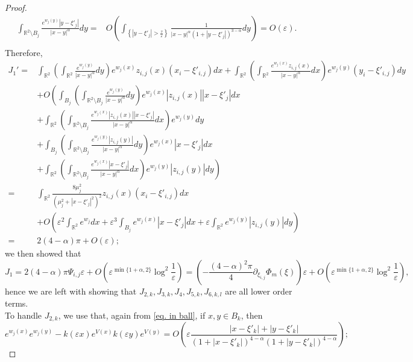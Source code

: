 \documentclass[11pt]{article}
\begin{document}
\begin{proof}
\begin{align*}
\int_{\mathbb R^2\setminus B_j}\frac{e^{w_j(y)}\left|y-\xi'_j\right|}{|x-y|^\alpha}dy=&O\left(\int_{\left\{\left|y-\xi'_j\right|>\frac\tau\varepsilon\right\}}\frac1{|x-y|^\alpha\left(1+\left|y-\xi'_j\right|\right)^{3-\alpha}}dy\right)=O(\varepsilon).\\
\end{align*}
Therefore,
\begin{align*}
J_1'=&\int_{\mathbb R^2}\left(\int_{\mathbb R^2}\frac{e^{w_j(y)}}{|x-y|^\alpha}dy\right)e^{w_j(x)}z_{i,j}(x)\left(x_i-\xi'_{i,j}\right)dx+\int_{\mathbb R^2}\left(\int_{\mathbb R^2}\frac{e^{w_j(x)}z_{i,j}(x)}{|x-y|^\alpha}dx\right)e^{w_j(y)}\left(y_i-\xi'_{i,j}\right)dy\\
&+O\left(\int_{B_j}\left(\int_{\mathbb R^2\setminus B_j}\frac{e^{w_j(y)}}{|x-y|^\alpha}dy\right)e^{w_j(x)}|z_{i,j}(x)|\left|x-\xi'_j\right|dx\right.\\
&\left.+\int_{\mathbb R^2}\left(\int_{\mathbb R^2\setminus B_j}\frac{e^{w_j(x)}|z_{i,j}(x)|\left|x-\xi'_j\right|}{|x-y|^\alpha}dx\right)e^{w_j(y)}dy\right.\\
&\left.+\int_{B_j}\left(\int_{\mathbb R^2\setminus B_j}\frac{e^{w_j(y)}|z_{i,j}(y)|}{|x-y|^\alpha}dy\right)e^{w_j(x)}\left|x-\xi'_j\right|dx\right.\\
&\left.+\int_{\mathbb R^2}\left(\int_{\mathbb R^2\setminus B_j}\frac{e^{w_j(x)}\left|x-\xi'_j\right|}{|x-y|^\alpha}dx\right)e^{w_j(y)}|z_{i,j}(y)|dy\right)\\
=&\int_{\mathbb R^2}\frac{8\mu_j^2}{\left(\mu_j^2+\left|x-\xi'_j\right|^2\right)^2}z_{i,j}(x)\left(x_i-\xi'_{i,j}\right)dx\\
&+O\left(\varepsilon^2\int_{\mathbb R^2}e^{w_j}dx+\varepsilon^3\int_{B_j}e^{w_j(x)}\left|x-\xi'_j\right|dx+\varepsilon\int_{\mathbb R^2}e^{w_j(y)}|z_{i,j}(y)|dy\right)\\
=&2(4-\alpha)\pi+O(\varepsilon);
\end{align*}
we then showed that
$$J_1=2(4-\alpha)\pi\Psi_{i,j}\varepsilon+O\left(\varepsilon^{\min\{1+\alpha,2\}}\log^2\frac1\varepsilon\right)=\left(-\frac{(4-\alpha)^2\pi}4\partial_{\xi_{i,j}}\Phi_m(\xi)\right)\varepsilon+O\left(\varepsilon^{\min\{1+\alpha,2\}}\log^2\frac1\varepsilon\right),$$
hence we are left with showing that $J_{2,k},J_{3,k},J_4,J_{5,k},J_{6,k,l}$ are all lower order terms.\\
To handle $J_{2,k}$, we use that, again from \eqref{eq. in ball}, if $x,y\in B_k$, then
$$e^{w_j(x)}e^{w_j(y)}-k(\varepsilon x)e^{V(x)}k(\varepsilon y)e^{V(y)}=O\left(\varepsilon\frac{\left|x-\xi'_k\right|+\left|y-\xi'_k\right|}{\left(1+\left|x-\xi'_k\right|\right)^{4-\alpha}\left(1+\left|y-\xi'_k\right|\right)^{4-\alpha}}\right);$$

\end{proof}
\end{document}
